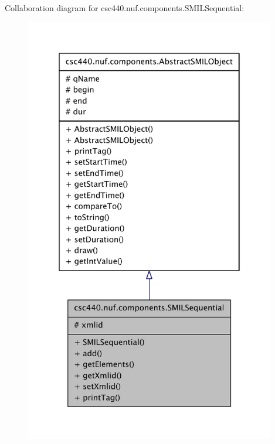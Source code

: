Collaboration diagram for csc440.\-nuf.\-components.\-S\-M\-I\-L\-Sequential\-:
\nopagebreak
\begin{figure}[H]
\begin{center}
\leavevmode
\includegraphics[width=310pt]{classcsc440_1_1nuf_1_1components_1_1_s_m_i_l_sequential__coll__graph}
\end{center}
\end{figure}
